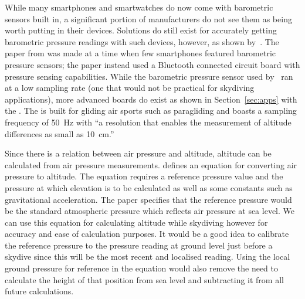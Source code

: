 \documentclass[11pt, a4paper, twocolumn]{article}
\begin{document}
While many smartphones and smartwatches do now come with barometric sensors built in, a significant portion of manufacturers do not see them as being worth putting in their devices. Solutions do still exist for accurately getting barometric pressure readings with such devices, however, as shown by~\textcite{he_atmospheric_2012}. The paper from \citeyear{he_atmospheric_2012} was made at a time when few smartphones featured barometric pressure sensors; the paper instead used a Bluetooth connected circuit board with pressure sensing capabilities. While the barometric pressure sensor used by~\textcite{he_atmospheric_2012} ran at a low sampling rate (one that would not be practical for skydiving applications), more advanced boards do exist as shown in Section~\ref{sec:apps} with the .
The  is built for gliding air sports such as paragliding and boasts a sampling frequency of \SI{50}{\Hz} with ``a resolution that enables the measurement of altitude differences as small as \SI{10}{\cm}.''

Since there is a relation between air pressure and altitude, altitude can be calculated from air pressure measurements. \textcite{liu_beyond_2014} defines an equation for converting air pressure to altitude. The equation requires a reference pressure value and the pressure at which elevation is to be calculated as well as some constants such as gravitational acceleration. The paper specifies that the reference pressure would be the standard atmospheric pressure which reflects air pressure at sea level. We can use this equation for calculating altitude while skydiving however for accuracy and ease of calculation purposes. It would be a good idea to calibrate the reference pressure to the pressure reading at ground level just before a skydive since this will be the most recent and localised reading. Using the local ground pressure for reference in the equation would also remove the need to calculate the height of that position from sea level and subtracting it from all future calculations.
\end{document}
